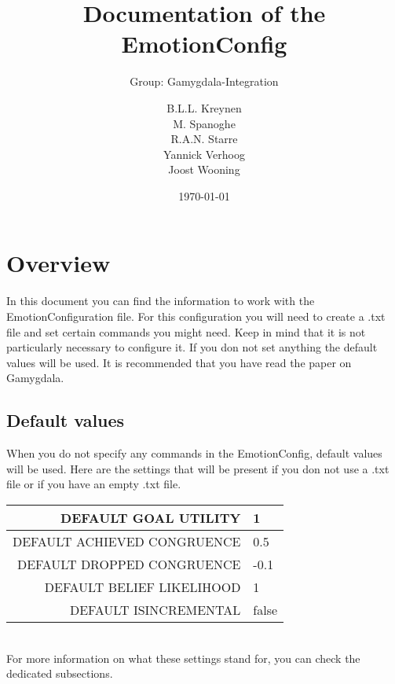 \documentclass{scrartcl}
\begin{document}
\title{Documentation of the EmotionConfig}
\subtitle{Group: Gamygdala-Integration}
\date{\today{}}

\author{
    \begin{tabular}{l r}
      B.L.L. Kreynen\\
      M. Spanoghe\\
      R.A.N. Starre\\
      Yannick Verhoog\\
      Joost Wooning\\
    \end{tabular}
}

\maketitle \thispagestyle{empty} \pagebreak
\pagebreak
\tableofcontents
\pagebreak

\section{Overview}
In this document you can find the information to work with the EmotionConfiguration file. For this configuration you will need to create a .txt file and set certain commands you might need. Keep in mind that it is not particularly necessary to configure it. If you don not set anything the default values will be used. It is recommended that you have read the paper on Gamygdala\cite{Gamygdala}. 

\subsection{Default values}
When you do not specify any commands in the EmotionConfig, default values will be used. Here are the settings that will be present if you don not use a .txt file or if you have an empty .txt file.\\
\begin{tabular}{|r|l|}
\hline  DEFAULT GOAL UTILITY & 1 \\ 
\hline  DEFAULT ACHIEVED CONGRUENCE & 0.5  \\ 
\hline  DEFAULT DROPPED CONGRUENCE & -0.1   \\ 
\hline  DEFAULT BELIEF LIKELIHOOD& 1   \\ 
\hline  DEFAULT ISINCREMENTAL & false   \\
\hline
\end{tabular}
\\
For more information on what these settings stand for, you can check the dedicated subsections.
\end{document}
